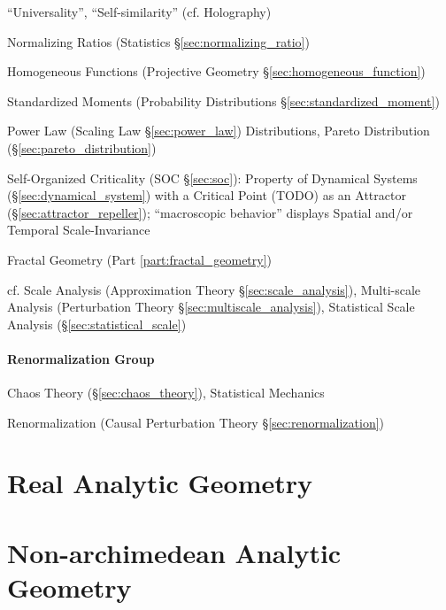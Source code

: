 ``Universality'', ``Self-similarity'' (cf. Holography)

\fist Normalizing Ratios (Statistics \S\ref{sec:normalizing_ratio})

\fist Homogeneous Functions (Projective Geometry
\S\ref{sec:homogeneous_function})

\fist Standardized Moments (Probability Distributions
\S\ref{sec:standardized_moment})

Power Law (Scaling Law \S\ref{sec:power_law}) Distributions, Pareto Distribution
(\S\ref{sec:pareto_distribution})

Self-Organized Criticality (SOC \S\ref{sec:soc}): Property of Dynamical Systems
(\S\ref{sec:dynamical_system}) with a Critical Point (TODO) as an Attractor
(\S\ref{sec:attractor_repeller}); ``macroscopic behavior'' displays Spatial
and/or Temporal Scale-Invariance

\fist Fractal Geometry (Part \ref{part:fractal_geometry})

cf. Scale Analysis (Approximation Theory \S\ref{sec:scale_analysis}),
  Multi-scale Analysis (Perturbation Theory \S\ref{sec:multiscale_analysis}),
Statistical Scale Analysis (\S\ref{sec:statistical_scale})



\paragraph{Renormalization Group}\label{sec:renormalization_group}\hfill

Chaos Theory (\S\ref{sec:chaos_theory}), Statistical Mechanics

Renormalization (Causal Perturbation Theory \S\ref{sec:renormalization})



\section{Real Analytic Geometry}\label{sec:real_analytic_geometry}

\section{Non-archimedean Analytic Geometry}
\label{sec:nonarchimedean_analytic_geometry}


